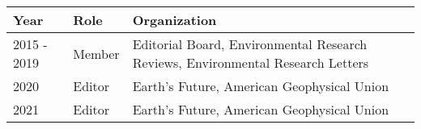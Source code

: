 
\begin{longtable}{llp{12cm}}
Year & Role & Organization\\
\hline 
\endhead 
2015 - 2019 & Member & Editorial Board, Environmental Research Reviews, Environmental Research Letters \\
2020  & Editor & Earth's Future, American Geophysical Union \\
2021 & Editor & Earth's Future, American Geophysical Union \\
\end{longtable}
